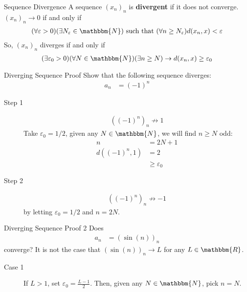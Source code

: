 \documentclass[10pt]{extarticle}
\newcommand{\N}{\mathbbm{N}}
\newcommand{\R}{\mathbbm{R}}
\begin{document}
  \begin{problem}{Sequence Divergence}
    A sequence $(x_n)_n$ is \textbf{divergent} if it does not converge. $(x_n)_n \rightarrow 0$ if and only if
    \begin{align*}
      (\forall \varepsilon > 0)(\exists N_{\varepsilon} \in \N) \text{ such that } (\forall n\geq N_{\varepsilon}) d(x_n,x) < \varepsilon
    \end{align*}
    So, $(x_n)_n$ diverges if and only if
    \begin{align*}
      (\exists \varepsilon_0 > 0)(\forall N\in\N) (\exists n\geq N) \rightarrow d(x_n,x)\geq \varepsilon_0
    \end{align*}
    \begin{problem}{Diverging Sequence Proof}
      Show that the following sequence diverges:
      \begin{align*}
        a_n &= (-1)^n
      \end{align*}
      \tcblower
      \begin{description}
        \item[Step 1]
          \begin{align*}
            \left((-1)^n\right)_n \not\rightarrow 1
          \end{align*}
          Take $\varepsilon_0 = 1/2$, given any $N\in\N$, we will find $n\geq N$ odd:
          \begin{align*}
            n &= 2N+1\\
            d((-1)^n,1) &= 2\\
                        &\geq \varepsilon_0
          \end{align*}
        \item[Step 2]
          \begin{align*}
            \left((-1)^n\right)_n \not\rightarrow -1
          \end{align*}
          by letting $\varepsilon_0 = 1/2$ and $n = 2N$.
      \end{description}
    \end{problem}
    \begin{problem}{Diverging Sequence Proof 2}
      Does
      \begin{align*}
        a_n &= \left(\sin(n)\right)_n
      \end{align*}
      converge?
      \tcblower
      It is not the case that $\left(\sin(n)\right)_n \rightarrow L$ for any $L\in\R$.
      \begin{description}
        \item[Case 1] If $L > 1$, set $\varepsilon_0 = \frac{L-1}{2}$. Then, given any $N\in\N$, pick $n = N$.

\end{description}
\end{problem}
\end{problem}
\end{document}
